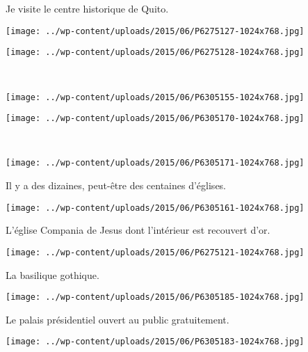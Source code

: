Je visite le centre historique de Quito. 
\begin{center} 
\texttt{[image: ../wp-content/uploads/2015/06/P6275127-1024x768.jpg]} 
\end{center}
\begin{center} 
\texttt{[image: ../wp-content/uploads/2015/06/P6275128-1024x768.jpg]} 
\end{center}
\vspace{-\topsep}
\vspace{-3.25mm}
\pagebreak
~
\begin{center} 
\texttt{[image: ../wp-content/uploads/2015/06/P6305155-1024x768.jpg]} 
\end{center}
\begin{center} 
\texttt{[image: ../wp-content/uploads/2015/06/P6305170-1024x768.jpg]} 
\end{center}
\vspace{-\topsep}
\vspace{-3.25mm}
\pagebreak
~
\begin{center} 
\texttt{[image: ../wp-content/uploads/2015/06/P6305171-1024x768.jpg]} 
\end{center}

Il y a des dizaines, peut-être des centaines d'églises. 
\begin{center} 
\texttt{[image: ../wp-content/uploads/2015/06/P6305161-1024x768.jpg]}
\end{center}
\vspace{-\topsep}
\pagebreak

L'église Compania de Jesus dont l'intérieur est recouvert d'or. 
\begin{center} 
\texttt{[image: ../wp-content/uploads/2015/06/P6275121-1024x768.jpg]} 
\end{center}

La basilique gothique. 
\begin{center} 
\texttt{[image: ../wp-content/uploads/2015/06/P6305185-1024x768.jpg]} 
\end{center}
\vspace{-\topsep}
\pagebreak

Le palais présidentiel ouvert au public gratuitement. 
\begin{center} 
\texttt{[image: ../wp-content/uploads/2015/06/P6305183-1024x768.jpg]} 
\end{center}

